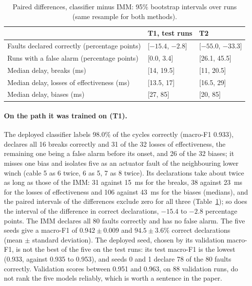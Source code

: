 \documentclass[10pt]{article}
\begin{document}
\begin{table}[h]
\centering\small
\caption{Paired differences, classifier minus IMM: 95\% bootstrap intervals over runs (same resample for both methods).}\label{tab:diff}
\begin{tabular}{@{}lll@{}}
\toprule
 & T1, test runs & T2 \\
\midrule
Faults declared correctly (percentage points) & [$-15.4$, $-2.8$] & [$-55.0$, $-33.3$] \\
Runs with a false alarm (percentage points) & [0.0, 3.4] & [26.1, 45.5] \\
Median delay, breaks (ms) & [14, 19.5] & [11, 20.5] \\
Median delay, losses of effectiveness (ms) & [13.5, 17] & [16.5, 29] \\
Median delay, biases (ms) & [27, 85] & [20, 85] \\
\bottomrule
\end{tabular}
\end{table}

\paragraph{On the path it was trained on (T1).} The deployed classifier labels 98.0\% of the cycles correctly (macro-F1 0.933), declares all 16 breaks correctly and 31 of the 32 losses of effectiveness, the remaining one being a false alarm before its onset, and 26 of the 32 biases; it misses one bias and isolates five as an actuator fault of the neighbouring lower winch (cable 5 as 6 twice, 6 as 5, 7 as 8 twice). Its declarations take about twice as long as those of the IMM: 31 against 15~ms for the breaks, 38 against 23~ms for the losses of effectiveness and 106 against 43~ms for the biases (medians), and the paired intervals of the differences exclude zero for all three (Table~\ref{tab:diff}); so does the interval of the difference in correct declarations, $-15.4$ to $-2.8$ percentage points. The IMM declares all 80 faults correctly and has no false alarm. The five seeds give a macro-F1 of $0.942\pm0.009$ and $94.5\pm3.6\%$ correct declarations (mean $\pm$ standard deviation). The deployed seed, chosen by its validation macro-F1, is not the best of the five on the test runs: its test macro-F1 is the lowest (0.933, against 0.935 to 0.953), and seeds 0 and 1 declare 78 of the 80 faults correctly. Validation scores between 0.951 and 0.963, on 88 validation runs, do not rank the five models reliably, which is worth a sentence in the paper.
\end{document}
